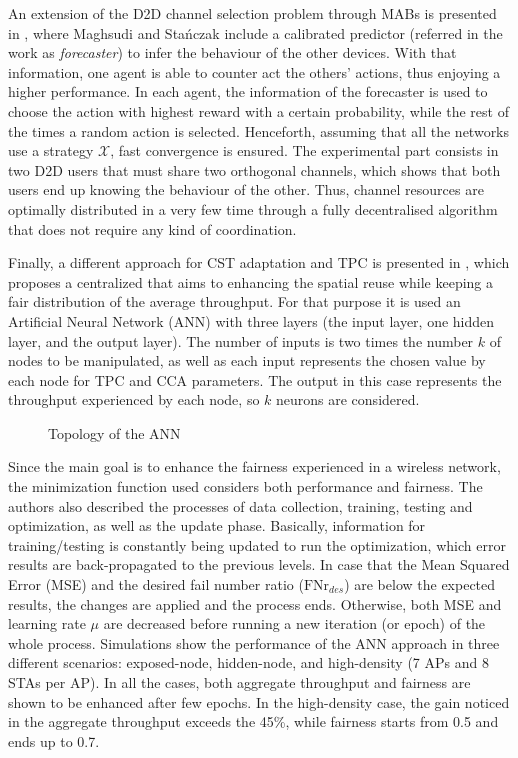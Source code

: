 \documentclass[12pt, a4paper,twoside]{tesi_upf}
\begin{document}
				An extension of the D2D channel selection problem through MABs is presented in \cite{maghsudi2015channel}, where Maghsudi and Sta{\'n}czak include a calibrated predictor (referred in the work as \textit{forecaster}) to infer the behaviour of the other devices. With that information, one agent is able to counter act the others' actions, thus enjoying a higher performance. In each agent, the information of the forecaster is used to choose the action with highest reward with a certain probability, while the rest of the times a random action is selected. Henceforth, assuming that all the networks use a strategy $\mathcal{X}$, fast convergence is ensured. The experimental part consists in two D2D users that must share two orthogonal channels, which shows that both users end up knowing the behaviour of the other. Thus, channel resources are optimally distributed in a very few time through a fully decentralised algorithm that does not require any kind of coordination.
			
				Finally, a different approach for CST adaptation and TPC is presented in \cite{jamil2016novel}, which proposes a centralized that aims to enhancing the spatial reuse while keeping a fair distribution of the average throughput. For that purpose it is used an Artificial Neural Network (ANN) with three layers (the input layer, one hidden layer, and the output layer). The number of inputs is two times the number $k$ of nodes to be manipulated, as well as each input represents the chosen value by each node for TPC and CCA parameters. The output in this case represents the throughput experienced by each node, so $k$ neurons are considered. 	
				\begin{figure}[h!]
					\centering
					\caption{Topology of the ANN}
					\label{fig:neural_network_topology}
				\end{figure}	
			
				Since the main goal is to enhance the fairness experienced in a wireless network, the minimization function used considers both performance and fairness. The authors also described the processes of data collection, training, testing and optimization, as well as the update phase. Basically, information for training/testing is constantly being updated to run the optimization, which error results are back-propagated to the previous levels. In case that the Mean Squared Error (MSE) and the desired fail number ratio ($\text{FNr}_{des}$) are below the expected results, the changes are applied and the process ends. Otherwise, both MSE and learning rate $\mu$ are decreased before running a new iteration (or epoch) of the whole process. Simulations show the performance of the ANN approach in three different scenarios: exposed-node,  hidden-node, and high-density (7 APs and 8 STAs per AP). In all the cases, both aggregate throughput and fairness are shown to be enhanced after few epochs. In the high-density case, the gain noticed in the aggregate throughput exceeds the 45\%, while fairness starts from 0.5 and ends up to 0.7.
\end{document}
